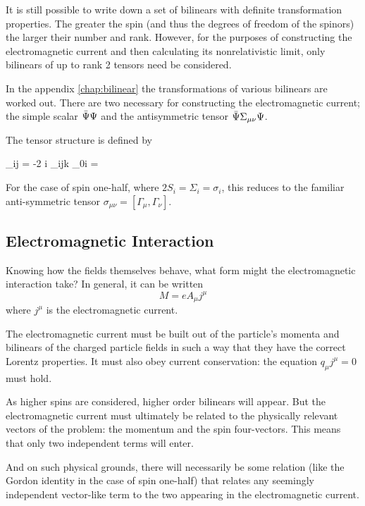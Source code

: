 It is still possible to write down a set of bilinears with definite transformation properties.  The greater the spin (and thus the degrees of freedom of the spinors) the larger their number and rank.  However, for the purposes of constructing the electromagnetic current and then calculating its nonrelativistic limit, only bilinears of up to rank 2 tensors need be considered.

In the appendix \ref{chap:bilinear} the transformations of various bilinears are worked out.  There are two necessary for constructing the electromagnetic current; the simple scalar $\bar{\Psi} \Psi$ and the antisymmetric tensor $\bar{\Psi} \Sigma_{\mu\nu} \Psi$.

The tensor structure is defined by

\beq \label{eq:Sg:SigDef}
	\Sigma_{ij} = -2 i \epsilon_{ijk} 
\eeq
\beq 
	\Sigma_{0i} = 
\eeq
 
For the case of spin one-half, where $2S_i = \Sigma_i = \sigma_i$, this reduces to the familiar anti-symmetric tensor $\sigma_{\mu\nu} = [\Gamma_\mu, \Gamma_\nu]$.
%

\subsection{Electromagnetic Interaction}
Knowing how the fields themselves behave, what form might the electromagnetic interaction take?  In general, it can be written
\[
	M = e A_\mu j^\mu 
\]
where $j^\mu$ is the electromagnetic current.


The electromagnetic current must be built out of the particle's momenta and bilinears of the charged particle fields in such a way that they have the correct Lorentz properties.  It must also obey current conservation: the equation $q_\mu j^\mu = 0$ must hold.  

As higher spins are considered, higher order bilinears will appear.  But the electromagnetic current must ultimately be related to the physically relevant vectors of the problem: the momentum and the spin four-vectors.  This means that only two independent terms will enter.

 And on such physical grounds, there will necessarily be some relation (like the Gordon identity in the case of spin one-half) that relates any seemingly independent vector-like term to the two appearing in the electromagnetic current.  

